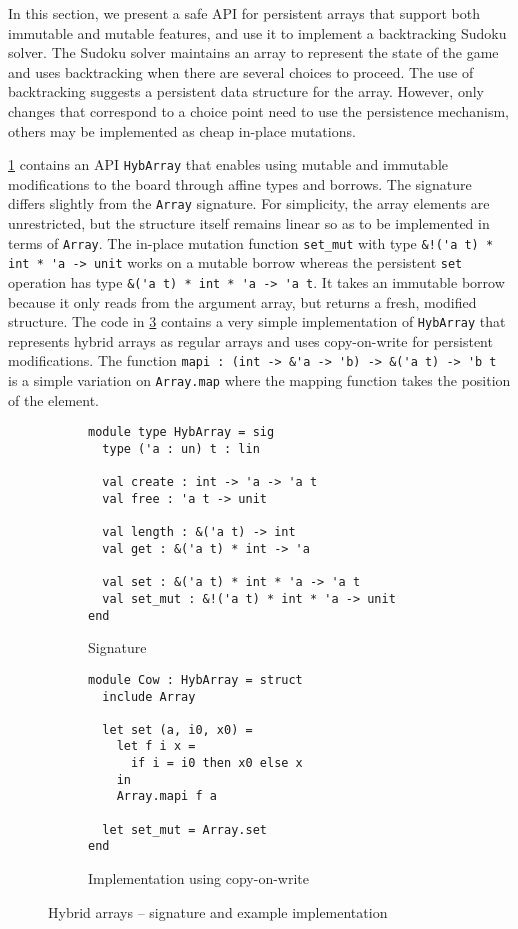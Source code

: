 In this section, we present
a safe API for persistent arrays that support both immutable and mutable features,
and use it to implement a backtracking Sudoku solver.
The Sudoku solver maintains an array to represent the state of
the game and uses backtracking when there are several choices to proceed.
The use of backtracking suggests a persistent data structure for the array.
However, only changes that correspond to a choice point need to use
the persistence mechanism, others may be implemented as
cheap in-place mutations.

\cref{sig:hybarray} contains an API \lstinline/HybArray/ 
that enables using mutable and immutable modifications to
the board through affine types and borrows.
The signature differs slightly from the \lstinline/Array/
signature. For simplicity, the array elements are unrestricted, but
the structure itself remains linear so as to be implemented in terms of \lstinline/Array/.
The in-place mutation function \lstinline/set_mut/ with type
\lstinline/&!('a t) * int * 'a -> unit/ works on a mutable borrow  whereas the persistent
\lstinline/set/ operation has type \lstinline/&('a t) * int * 'a -> 'a t/. It
takes an immutable borrow because it only reads from the
argument array, but returns a fresh,  modified structure.
The code in \cref{ex:cow} contains a very simple implementation of
\lstinline/HybArray/ that represents hybrid arrays
as regular arrays and uses copy-on-write for persistent
modifications. The function
\lstinline/mapi : (int -> &'a -> 'b) -> &('a t) -> 'b t /
is a simple variation on \lstinline/Array.map/ where the mapping function
takes the position of the element.


\begin{figure}[tp]
  \centering
  \begin{subfigure}{0.48\linewidth}
\begin{lstlisting}
module type HybArray = sig
  type ('a : un) t : lin
  
  val create : int -> 'a -> 'a t
  val free : 'a t -> unit

  val length : &('a t) -> int
  val get : &('a t) * int -> 'a

  val set : &('a t) * int * 'a -> 'a t
  val set_mut : &!('a t) * int * 'a -> unit
end
\end{lstlisting}
    \caption{Signature}
    \label{sig:hybarray}
  \end{subfigure}\hfill
  \begin{subfigure}{0.5\linewidth}
\begin{lstlisting}
module Cow : HybArray = struct
  include Array

  let set (a, i0, x0) =
    let f i x =
      if i = i0 then x0 else x
    in
    Array.mapi f a
  
  let set_mut = Array.set
end
\end{lstlisting}
    \caption{Implementation using copy-on-write}
    \label{ex:cow}
  \end{subfigure}
  \caption{Hybrid arrays -- signature and example implementation}
\end{figure}

